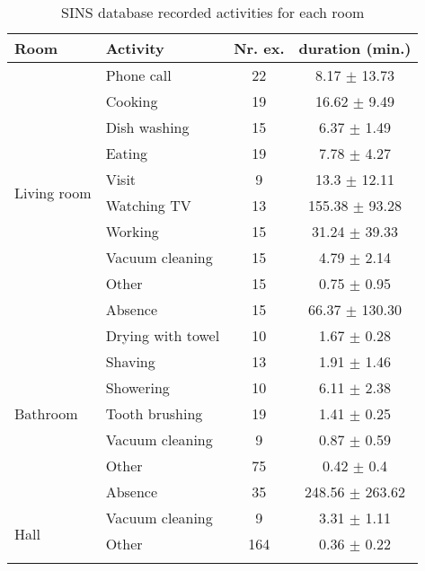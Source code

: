 \begin{table}[htbp]
    \centering
    \caption[SINS database recorded activities for each room]{SINS database recorded activities for each room \footnotemark}
	\label{tab:sins-database-recorded-activities}
    \begin{tabular}{l|l|c|c}
        \toprule
        \textbf{Room} & \textbf{Activity} & \textbf{Nr. ex.} & \textbf{duration (min.)} \\ 
        \midrule[1pt]
        \multirow{10}{*}{Living room} & Phone call & 22 & 8.17 $\pm$ 13.73 \\
        \cline{2-4}
        & Cooking & 19 & 16.62 $\pm$ 9.49 \\
        \cline{2-4}
        & Dish washing & 15 & 6.37 $\pm$ 1.49 \\
        \cline{2-4}
        & Eating & 19 & 7.78 $\pm$ 4.27 \\
        \cline{2-4}
        & Visit & 9 & 13.3 $\pm$ 12.11 \\
        \cline{2-4}
        & Watching TV & 13 & 155.38 $\pm$ 93.28 \\
        \cline{2-4}
        & Working & 15 & 31.24 $\pm$ 39.33 \\
        \cline{2-4}
        & Vacuum cleaning & 15 & 4.79 $\pm$ 2.14 \\
        \cline{2-4}
        & Other & 15 & 0.75 $\pm$ 0.95 \\
        \cline{2-4}
        & Absence & 15 & 66.37 $\pm$ 130.30 \\
        \midrule[1pt]
        \multirow{7}{*}{Bathroom} & Drying with towel & 10 & 1.67 $\pm$ 0.28 \\
        \cline{2-4}
        & Shaving & 13 & 1.91 $\pm$ 1.46 \\
        \cline{2-4}
        & Showering & 10 & 6.11 $\pm$ 2.38 \\
        \cline{2-4}
        & Tooth brushing & 19 & 1.41 $\pm$ 0.25 \\
        \cline{2-4}
        & Vacuum cleaning & 9 & 0.87 $\pm$ 0.59 \\
        \cline{2-4}
        & Other & 75 & 0.42 $\pm$ 0.4 \\
        \cline{2-4}
        & Absence & 35 & 248.56 $\pm$ 263.62 \\
        \midrule[1pt]
        \multirow{3}{*}{Hall} & Vacuum cleaning & 9 & 3.31 $\pm$ 1.11 \\
        \cline{2-4}
        & Other & 164 & 0.36 $\pm$ 0.22 \\
        \cline{2-4}

\end{tabular}
\end{table}
